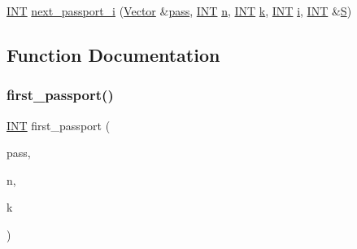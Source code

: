 \begin{DoxyCompactItemize}
\item 
\mbox{\hyperlink{galois_8h_a09fddde158a3a20bd2dcadb609de11dc}{I\+NT}} \mbox{\hyperlink{number__partition_8_c_a9f22020a31cc9ad379f8a224896c8472}{next\+\_\+passport\+\_\+i}} (\mbox{\hyperlink{class_vector}{Vector}} \&\mbox{\hyperlink{clique__finder_8_c_aba24b5be3d3e0e4b86665c305ee69e1c}{pass}}, \mbox{\hyperlink{galois_8h_a09fddde158a3a20bd2dcadb609de11dc}{I\+NT}} \mbox{\hyperlink{simeon_8_c_a7f2cd26777ce0ff3fdaf8d02aacbddfb}{n}}, \mbox{\hyperlink{galois_8h_a09fddde158a3a20bd2dcadb609de11dc}{I\+NT}} \mbox{\hyperlink{simeon_8_c_a43fa990200c3ddd47c35f151bd4d66bf}{k}}, \mbox{\hyperlink{galois_8h_a09fddde158a3a20bd2dcadb609de11dc}{I\+NT}} \mbox{\hyperlink{alphabet2_8_c_acb559820d9ca11295b4500f179ef6392}{i}}, \mbox{\hyperlink{galois_8h_a09fddde158a3a20bd2dcadb609de11dc}{I\+NT}} \&\mbox{\hyperlink{simeon_8_c_adab47f8243f1b5a2c31df2535d6b37d0}{S}})
\end{DoxyCompactItemize}


\subsection{Function Documentation}
\mbox{\label{number__partition_8_c_a8e5f1fd6e29a944ed7eea797ad23d1c8}} 
\subsubsection{\texorpdfstring{first\+\_\+passport()}{first\_passport()}}
{\footnotesize\ttfamily \mbox{\hyperlink{galois_8h_a09fddde158a3a20bd2dcadb609de11dc}{I\+NT}} first\+\_\+passport (\begin{DoxyParamCaption}\item[{\mbox{\hyperlink{class_vector}{Vector}} \&}]{pass,  }\item[{\mbox{\hyperlink{galois_8h_a09fddde158a3a20bd2dcadb609de11dc}{I\+NT}}}]{n,  }\item[{\mbox{\hyperlink{galois_8h_a09fddde158a3a20bd2dcadb609de11dc}{I\+NT}}}]{k }\end{DoxyParamCaption})}

\mbox{\label{number__partition_8_c_a55d261ef239bdfff783bd501afa5f37f}} 
